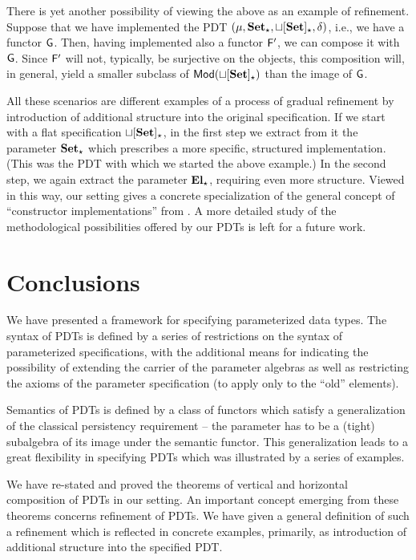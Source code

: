 %
There is yet another possibility of viewing the above as an example of
refinement. Suppose that we have implemented the PDT
$(\mu,{\bf Set_\star},{\bf \sqcup[Set]_\star},\delta)$, i.e., we
have a functor ${\sf {G}}$.  Then, having implemented also a functor ${\sf {F}}'$, we
can compose it with ${\sf {G}}$. Since ${\sf {F}}'$ will not, typically, be
surjective on the objects, this composition will, in general, yield a smaller
subclass of ${\sf {Mod}}({\bf \sqcup[Set]_\star})$ than the image of ${\sf {G}}$.

All these scenarios are different examples of a process of gradual
refinement by introduction of additional structure into the original
specification. If we start with a flat specification
${\bf \sqcup[Set]_\star}$, in the first
step we extract from it the parameter ${\bf Set_\star}$ which prescribes a
more specific, structured implementation. (This was the PDT {} with
which we started the above example.) In the second step, we again extract
the parameter ${\bf El_\star}$, requiring even more structure. Viewed in this
way, our setting gives a concrete specialization of the general concept of
``constructor implementations'' from \cite{para1}. A more detailed study of
the methodological possibilities offered by our PDTs is left for a future work.

\section{Conclusions}\label{se:conc}
We have presented a framework for specifying parameterized data types. The
syntax of PDTs is defined by a series of restrictions on the
syntax of parameterized specifications, with the additional means for indicating
the possibility of extending the carrier of the parameter algebras as well as
restricting the axioms of the parameter specification (to apply only  to the ``old''
elements). 

Semantics of PDTs is defined by a class of functors which satisfy a
generalization of the classical persistency requirement -- the parameter
has to be a (tight) subalgebra of its image under the semantic functor. This
generalization leads to a great flexibility in specifying PDTs which was
illustrated by a series of examples. 

We have re-stated and proved the theorems of vertical and horizontal
composition of PDTs in our setting. An important concept emerging from these
theorems concerns refinement of PDTs. We have given a general definition of
such a refinement which is reflected in concrete examples, primarily, as introduction of
additional structure into the specified PDT.

